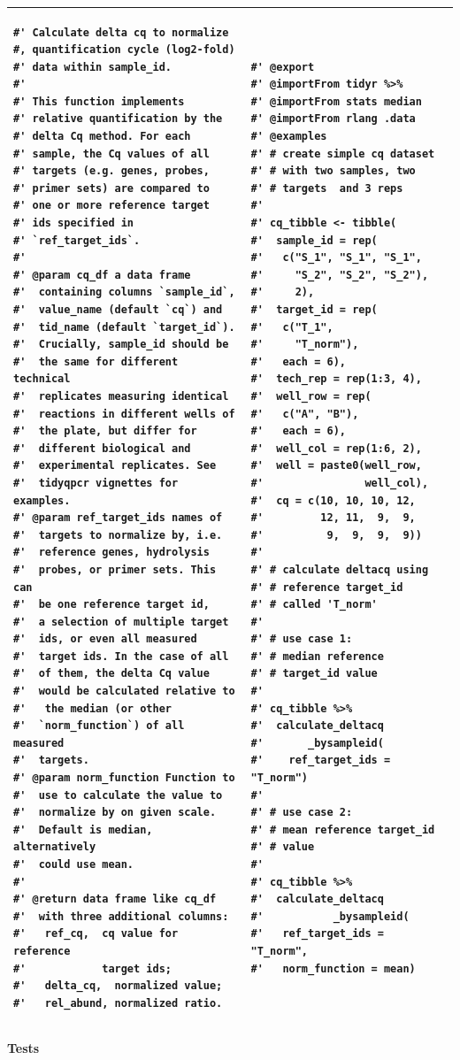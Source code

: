 \documentclass{SBCbookchapter}
\begin{document}
\begin{center}
\begin{tabular}{| p{6.1cm}  p{5.6cm} |}
\hline
\begin{lstlisting}
#' Calculate delta cq to normalize 
#, quantification cycle (log2-fold)
#' data within sample_id.
#'
#' This function implements 
#' relative quantification by the 
#' delta Cq method. For each 
#' sample, the Cq values of all 
#' targets (e.g. genes, probes, 
#' primer sets) are compared to 
#' one or more reference target 
#' ids specified in 
#' `ref_target_ids`.
#'
#' @param cq_df a data frame 
#'  containing columns `sample_id`,
#'  value_name (default `cq`) and
#'  tid_name (default `target_id`).
#'  Crucially, sample_id should be
#'  the same for different technical
#'  replicates measuring identical 
#'  reactions in different wells of 
#'  the plate, but differ for 
#'  different biological and 
#'  experimental replicates. See 
#'  tidyqpcr vignettes for examples.
#' @param ref_target_ids names of 
#'  targets to normalize by, i.e. 
#'  reference genes, hydrolysis 
#'  probes, or primer sets. This can 
#'  be one reference target id,
#'  a selection of multiple target
#'  ids, or even all measured 
#'  target ids. In the case of all 
#'  of them, the delta Cq value 
#'  would be calculated relative to
#'   the median (or other 
#'  `norm_function`) of all measured 
#'  targets.
#' @param norm_function Function to 
#'  use to calculate the value to
#'  normalize by on given scale. 
#'  Default is median, alternatively 
#'  could use mean.
#'
#' @return data frame like cq_df 
#'  with three additional columns:
#'   ref_cq,  cq value for reference 
#'            target ids;
#'   delta_cq,  normalized value;
#'   rel_abund, normalized ratio.
\end{lstlisting} &
\begin{lstlisting}[firstnumber=52]
#' @export
#' @importFrom tidyr %>%
#' @importFrom stats median
#' @importFrom rlang .data
#' @examples
#' # create simple cq dataset 
#' # with two samples, two 
#' # targets  and 3 reps
#'
#' cq_tibble <- tibble(
#'  sample_id = rep(
#'   c("S_1", "S_1", "S_1", 
#'     "S_2", "S_2", "S_2"),
#'     2),
#'  target_id = rep(
#'   c("T_1",
#'     "T_norm"),
#'   each = 6),
#'  tech_rep = rep(1:3, 4),
#'  well_row = rep(
#'   c("A", "B"),
#'   each = 6),
#'  well_col = rep(1:6, 2),
#'  well = paste0(well_row,
#'                well_col),
#'  cq = c(10, 10, 10, 12,
#'         12, 11,  9,  9, 
#'          9,  9,  9,  9))
#'                      
#' # calculate deltacq using
#' # reference target_id 
#' # called 'T_norm'
#' 
#' # use case 1: 
#' # median reference 
#' # target_id value
#'
#' cq_tibble %>%
#'  calculate_deltacq
#'       _bysampleid(
#'    ref_target_ids = "T_norm")
#' 
#' # use case 2: 
#' # mean reference target_id 
#' # value 
#'
#' cq_tibble %>%
#'  calculate_deltacq
#'           _bysampleid(
#'   ref_target_ids = "T_norm",
#'   norm_function = mean)
\end{lstlisting} \\
\hline
\end{tabular}
\end{center}
\newpage
\textbf{Tests}
\end{document}
